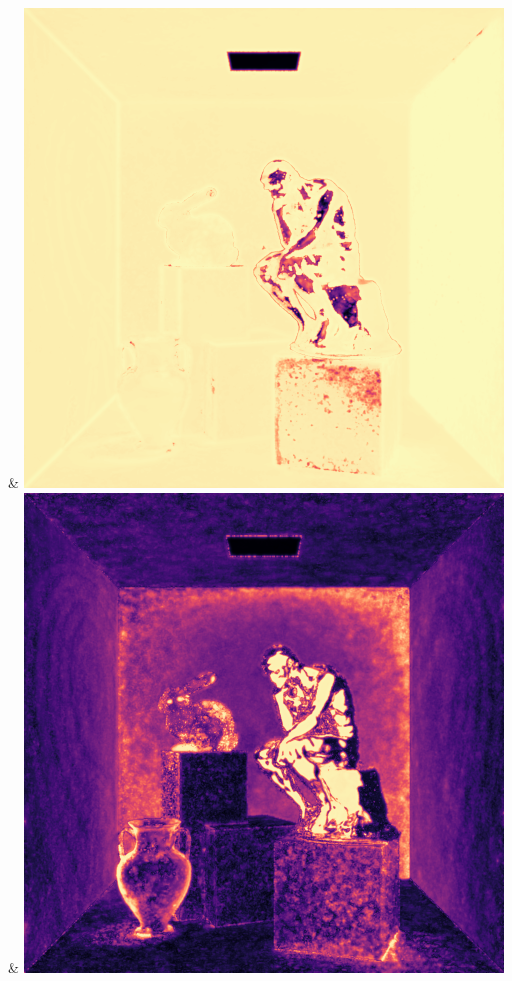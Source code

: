 & \includegraphics[width=\linewidth]{figures/py/tests/quality_comparison/nrc+lt+bal_1spp_thinker_flip.png}
& \includegraphics[width=\linewidth]{figures/py/tests/quality_comparison/nrc+sppc_1spp_thinker_flip.png}
